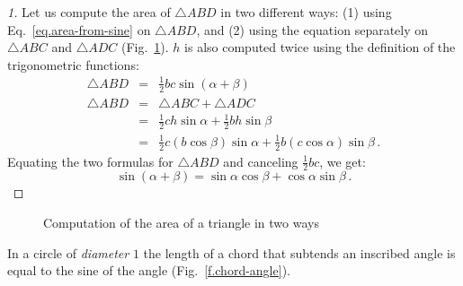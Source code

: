 \begin{proof}[1]
Let us compute the area of $\triangle ABD$ in two different ways: (1) using Eq.~\ref{eq.area-from-sine} on $\triangle ABD$, and (2) using the equation separately on $\triangle ABC$ and $\triangle ADC$ (Fig.~\ref{f.sin-sum2}).
$h$ is also computed twice using the definition of the trigonometric functions:
\begin{eqnarray*}
\triangle ABD &=& \frac{1}{2}bc\sin(\alpha+\beta)\\
\triangle ABD &=& \triangle ABC+\triangle ADC\\
&=& \frac{1}{2}ch\sin \alpha + \frac{1}{2}bh\sin \beta\\
&=& \frac{1}{2}c(b\cos\beta)\sin \alpha + \frac{1}{2}b(c\cos\alpha)\sin \beta\,.
\end{eqnarray*}
Equating the two formulas for $\triangle ABD$ and canceling $\frac{1}{2}bc$, we get:
\[
\sin(\alpha+\beta)=\sin\alpha\cos\beta+\cos \alpha\sin\beta\,.
\]
\end{proof}


\begin{figure}[tb]
\begin{center}
\end{center}
\caption{Computation of the area of a triangle in two ways}\label{f.sin-sum2}
\end{figure}

\begin{theorem}
In a circle of \emph{diameter} $1$ the length of a chord that subtends an inscribed angle is equal to the sine of the angle (Fig.~\ref{f.chord-angle}).
\end{theorem}




